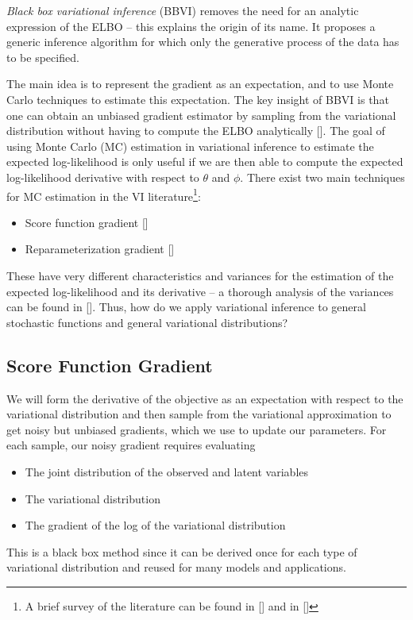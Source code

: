 \textit{Black box variational inference} (BBVI) removes the need for an analytic expression of the ELBO -- this explains the origin of its name. It proposes a generic inference algorithm for which only the generative process of the data has to be specified. 

The main idea is to represent the gradient as an expectation, and to use Monte Carlo techniques to estimate this expectation. The key insight of BBVI is that one can obtain an unbiased gradient estimator by sampling from the variational distribution without having to compute the ELBO analytically [\cite{Paisley2012}]. The goal of using Monte Carlo (MC) estimation in variational inference to estimate the expected log-likelihood is only useful if we are then able to compute the expected log-likelihood derivative with respect to $\theta$ and $\phi$. There exist two main techniques for MC estimation in the VI literature\footnote{A brief survey of the literature can be found in [\cite{Schulman2015}] and in [\cite{Zhang2017}]}: 
\begin{itemize}
    \item Score function gradient [\cite{Ranganath2014, Mnih2014}]
    \item Reparameterization gradient [\cite{Kingma2013, Rezende2014}]
\end{itemize}
These have very different characteristics and variances for the estimation of the expected log-likelihood and its derivative -- a thorough analysis of the variances can be found in [\cite{Gal2016}]. Thus, how do we apply variational inference to general stochastic functions and general variational distributions? 





\subsection{Score Function Gradient}
We will form the derivative of the objective as an expectation with respect to the variational
distribution and then sample from the variational approximation to get noisy but unbiased gradients, which
we use to update our parameters. For each sample, our noisy gradient requires evaluating 
\begin{itemize}
    \item The joint distribution of the observed and latent variables
    \item The variational distribution
    \item The gradient of the log of the variational distribution
\end{itemize}
This is a black box method since it can be derived once for each type of variational distribution and reused for many models and applications. 

